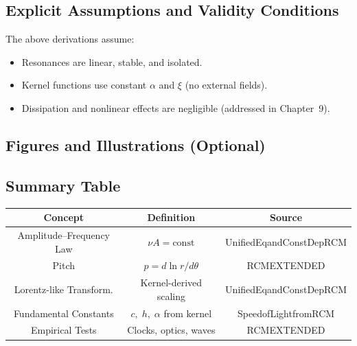 \subsection{Explicit Assumptions and Validity Conditions}
\label{sec:assumptions-pitch}

The above derivations assume:
\begin{itemize}
  \item Resonances are linear, stable, and isolated.
  \item Kernel functions use constant $\alpha$ and $\xi$ (no external fields).
  \item Dissipation and nonlinear effects are negligible (addressed in Chapter~9).
\end{itemize}

\subsection{Figures and Illustrations (Optional)}
\label{sec:figures-pitch}


\subsection{Summary Table}
\label{sec:summary-pitch}

\begin{center}
\begin{tabular}{|c|c|c|}
\hline
\textbf{Concept} & \textbf{Definition} & \textbf{Source} \\ \hline
Amplitude–Frequency Law & $\nu A=\mathrm{const}$ & UnifiedEqandConstDepRCM \\ \hline
Pitch & $p=d\ln r/d\theta$ & RCMEXTENDED \\ \hline
Lorentz-like Transform. & Kernel-derived scaling & UnifiedEqandConstDepRCM \\ \hline
Fundamental Constants & $c,\;h,\;\alpha$ from kernel & SpeedofLightfromRCM \\ \hline
Empirical Tests & Clocks, optics, waves & RCMEXTENDED \\ \hline
\end{tabular}
\end{center}


